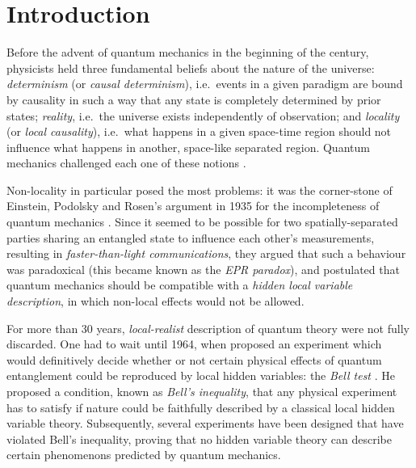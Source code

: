 \section{Introduction}\label{introduction}

Before the advent of quantum mechanics in the beginning of the  century, physicists held three fundamental beliefs about the nature of the universe: 
\emph{determinism} (or \emph{causal determinism}), i.e.\ 
events in a given paradigm are bound by causality in such a way that any state is completely determined by prior states; 
\emph{reality}, i.e.\ the universe exists independently of observation; 
and \emph{locality} (or \emph{local causality}), i.e.\ what happens in a given space-time region should not influence what happens in another, space-like separated region. Quantum mechanics challenged each one of these notions \cite{nielsen_quantum_2010}.

Non-locality in particular posed the most problems: it was the corner-stone of Einstein, Podolsky and Rosen's argument in 1935 for the incompleteness of quantum mechanics \cite{epr}. 
Since it seemed to be possible for two spatially-separated parties sharing an entangled state to influence each other's measurements, resulting in \emph{faster-than-light communications}, they argued that such a behaviour was paradoxical (this became known as the \emph{EPR paradox}), and postulated that quantum mechanics should be compatible with a \emph{hidden local variable description}, in which non-local effects would not be allowed.

For more than 30 years, \emph{local-realist} description of quantum 
theory were not fully discarded. 
One had to wait until 1964, when \citeauthor{bell_einstein_1964}
proposed an experiment which would definitively decide whether or not certain physical effects of quantum entanglement could be reproduced
by local hidden variables: the \emph{Bell test} \cite{bell_einstein_1964}. He proposed a condition, known as \emph{Bell’s inequality}, that any physical experiment
has to satisfy if nature could be faithfully described by a classical local hidden variable theory. Subsequently, several experiments
\cite{aspect_experiment} have been designed that have violated Bell’s inequality, proving 
that no hidden variable theory can describe certain phenomenons predicted by quantum mechanics.

